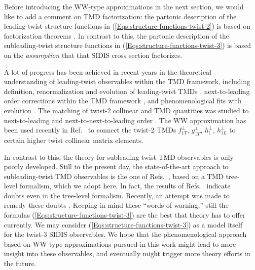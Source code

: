 \documentclass[a4paper,11pt]{article}
\newcommand{\blue}[1]{{\color{blue} #1}}
\newcommand{\ps}[1]{\blue{#1}}
\begin{document}
Before introducing the WW-type approximations in the next section,
we would like to add a comment on TMD factorization: the
partonic description of the leading-twist structure functions in
(\ref{Eqs:structure-functions-twist-2}) is based on factorization
theorems \cite{Collins:1981uk,Ji:2004wu,Ji:2004xq,Collins:2011zzd,
Echevarria:2012js}. In contrast to this, the partonic description
of the subleading-twist structure functions in
(\ref{Eqs:structure-functions-twist-3}) is based on the
{\it assumption} that that SIDIS cross section factorizes.

A lot of progress has been achieved in recent years in the
theoretical understanding of leading-twist observables within the TMD
framework, including definition, renormalization and evolution of
leading-twist TMDs
\cite{Aybat:2011zv,Aybat:2011ge,Echevarria:2014xaa,Collins:2014jpa},
\ps{next-to-leading order} corrections within the TMD framework
\cite{Ma:2013aca}, and phenomenological fits with evolution
\cite{Aybat:2011ta,Kang:2015msa}.
\ps{The matching of twist-2 collinear and TMD quantities was
studied to next-to-leading and next-to-next-to-leading order
\cite{Gutierrez-Reyes:2017glx,Gutierrez-Reyes:2018qez}.}
%
%
%
\ps{The WW approximation has been used recently in Ref.~\cite{Scimemi:2018mmi}
to connect the twist-2 TMDs $f_{1T}^\perp$, $g_{1T}^\perp$, $h_{1}^\perp$,
$h_{1L}^\perp$ to certain higher twist collinear matrix elements.}

In contrast to this, the theory for subleading-twist TMD observables is
only poorly developed. Still to the present day, the state-of-the-art
approach to subleading-twist TMD observables is the one of
Refs.~\cite{Kotzinian:1994dv,Mulders:1995dh,Boer:1997nt,Goeke:2005hb,
Bacchetta:2006tn},
based on a TMD tree-level formalism, which we adopt here.
In fact, the results of Refs.~\cite{Metz:2004je,Gamberg:2006ru}
indicate doubts even in the tree-level formalism.
Recently, an attempt was made to remedy these doubts \cite{Chen:2016hgw}.
Keeping in mind these ``words of warning,'' still the formulas
(\ref{Eqs:structure-functions-twist-3})
are the best that theory has to offer currently. We may consider
(\ref{Eqs:structure-functions-twist-3}) as a model itself for
the twist-3 SIDIS observables. We hope that the phenomenological
approach based on WW-type approximations pursued in this work might
lead to more insight into these observables, and eventually might
trigger more theory efforts in the future.
\end{document}
